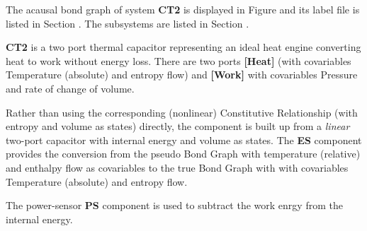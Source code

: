 

   The acausal bond graph of system \textbf{CT2} is
   displayed in Figure  and its label
   file is listed in Section .
   The subsystems are listed in Section .

\textbf{CT2} is a two port thermal capacitor representing an ideal
heat engine converting heat to work without energy loss. There are two
ports {\bf [Heat]} (with covariables Temperature (absolute) and
entropy flow) and {\bf [Work]} with covariables Pressure and rate of
change of volume. 

Rather than using the corresponding (nonlinear) Constitutive
Relationship (with entropy and volume as states) directly, the
component is built up from a {\em linear\/} two-port capacitor with
internal energy and volume as states. The {\bf ES} component provides
the conversion from the pseudo Bond Graph with temperature (relative)
and enthalpy flow as covariables to the true Bond Graph with with
covariables Temperature (absolute) and entropy flow.

The power-sensor {\bf PS} component is used to subtract the work enrgy
from the internal energy.








